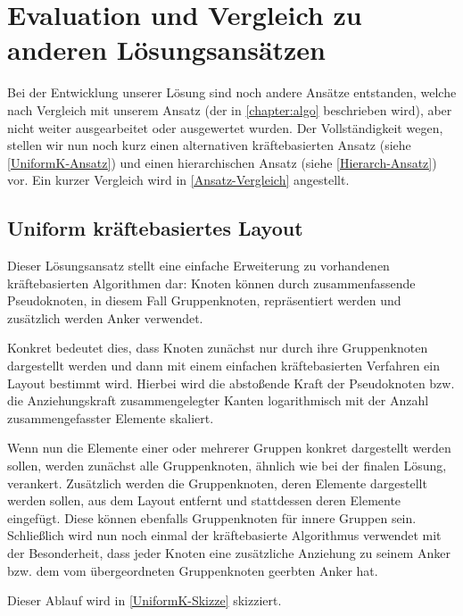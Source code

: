 \chapter{Evaluation und Vergleich zu anderen Lösungsansätzen}
\label{chapter:vgl}

Bei der Entwicklung unserer Lösung sind noch andere Ansätze entstanden, welche nach Vergleich mit unserem Ansatz (der in \autoref{chapter:algo} beschrieben wird), aber nicht weiter ausgearbeitet oder ausgewertet wurden. Der Vollständigkeit wegen, stellen wir nun noch kurz einen alternativen kräftebasierten Ansatz (siehe \autoref{UniformK-Ansatz}) und einen hierarchischen Ansatz (siehe \autoref{Hierarch-Ansatz}) vor. Ein kurzer Vergleich wird in \autoref{Ansatz-Vergleich} angestellt.

\section{Uniform kräftebasiertes Layout}
\label{UniformK-Ansatz}
Dieser Lösungsansatz stellt eine einfache Erweiterung zu vorhandenen kräftebasierten Algorithmen dar: Knoten können durch zusammenfassende Pseudoknoten, in diesem Fall Gruppenknoten, repräsentiert werden und zusätzlich werden Anker verwendet.

Konkret bedeutet dies, dass Knoten zunächst nur durch ihre Gruppenknoten dargestellt werden und dann mit einem einfachen kräftebasierten Verfahren ein Layout bestimmt wird. Hierbei wird die abstoßende Kraft der Pseudoknoten bzw. die Anziehungskraft zusammengelegter Kanten logarithmisch mit der Anzahl zusammengefasster Elemente skaliert.

Wenn nun die Elemente einer oder mehrerer Gruppen konkret dargestellt werden sollen, werden zunächst alle Gruppenknoten, ähnlich wie bei der finalen Lösung, verankert. 
Zusätzlich werden die Gruppenknoten, deren Elemente dargestellt werden sollen, aus dem Layout entfernt und stattdessen deren Elemente eingefügt. Diese können ebenfalls Gruppenknoten für innere Gruppen sein. Schließlich wird nun noch einmal der kräftebasierte Algorithmus verwendet mit der Besonderheit, dass jeder Knoten eine zusätzliche Anziehung zu seinem Anker bzw. dem vom übergeordneten Gruppenknoten geerbten Anker hat.

Dieser Ablauf wird in \autoref{UniformK-Skizze} skizziert.

